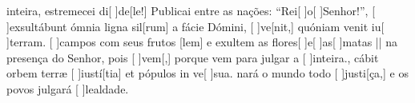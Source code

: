 {        { inteira, estremecei di[ ]{de}[le!] Publicai entre as nações: ``Rei[ ]{o}[ ]{Se}{nhor}!''},
    {[ ]{ex}sultábunt ómnia ligna sil[rum] a fácie Dómini, [ ]{ve}[nit,] quóniam venit iu[ ]{ter}ram.}%
        {[ ]{cam}pos com seus frutos [lem] e exultem as flores[ ]{e}[ ]{as}[ ]{ma}tas || na presença do Senhor, pois [ ]{vem}[,] porque vem para julgar a [ ]{in}{tei}ra.},
    {cábit orbem terræ [ ]{iu}{stí}[tia] et pópulos in ve[ ]{su}a.}%
        {nará o mundo todo [ ]{jus}{ti}[ça,] e os povos julgará [ ]{le}{al}{da}de.}
}